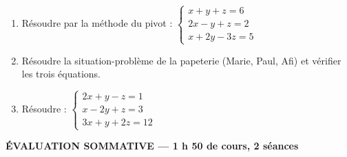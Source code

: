 \documentclass[a4paper,11pt]{article}
\begin{document}
\begin{tcolorbox}[colback=appl!5, colframe=appl, boxrule=0.8pt, arc=2pt,
                  left=6pt, right=6pt, top=4pt, bottom=4pt,
                  title={\textbf{APPLICATION --- Séance 2}},
                  colbacktitle=appl, coltitle=white, fonttitle=\bfseries]
\begin{enumerate}[label=\textbf{Exercice \arabic*.}, leftmargin=*, itemsep=4pt]
  \item Résoudre par la méthode du pivot :
        $\begin{cases}x+y+z=6\\ 2x-y+z=2\\ x+2y-3z=5\end{cases}$
  \item Résoudre la situation-problème de la papeterie (Marie, Paul, Afi) et
        vérifier les trois équations.
  \item Résoudre : $\begin{cases}2x+y-z=1\\ x-2y+z=3\\ 3x+y+2z=12\end{cases}$
\end{enumerate}
\end{tcolorbox}

\newpage
\noindent\colorbox{evalc}{%
  \parbox[c][0.72cm][c]{\dimexpr\linewidth-2\fboxsep\relax}{%
    \color{white}\large\textbf{ÉVALUATION SOMMATIVE --- 1 h 50 de cours, 2 séances}}%
}
\end{document}
